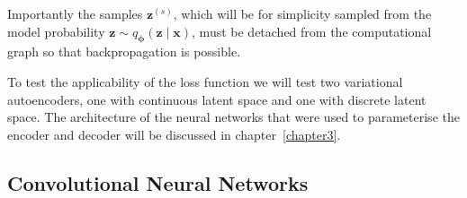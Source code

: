 Importantly the samples $\mathbf{z}^{(s)}$, which will be for simplicity sampled from the model probability $\mathbf{z} \sim  q_{\boldsymbol{\phi}}(\mathbf{z} \mid \mathbf{x})$, must be detached from the computational graph so that backpropagation is possible. 

To test the applicability of the loss function we will test two variational autoencoders, one with continuous latent space and one with discrete latent space. The architecture of the neural networks that were used to parameterise the encoder and decoder will be discussed in chapter~\ref{chapter3}.

\subsection{Convolutional Neural Networks}


